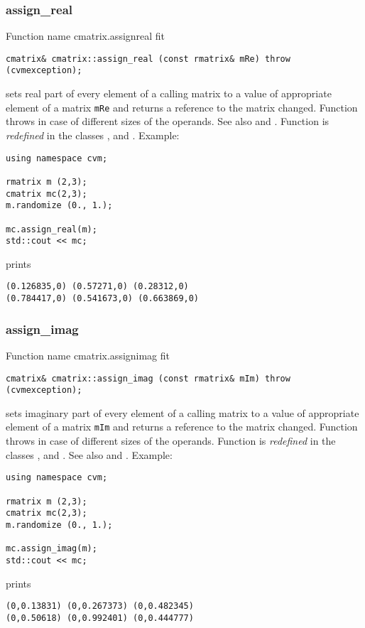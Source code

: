 \subsubsection{assign\_real}
Function%
\pdfdest name {cmatrix.assignreal} fit
\begin{verbatim}
cmatrix& cmatrix::assign_real (const rmatrix& mRe) throw (cvmexception);
\end{verbatim}
sets real part of every element of a calling matrix to a value of
appropriate element of a matrix \verb"mRe"
and returns a reference to
the matrix changed.
Function throws  
in case of different sizes of the operands.
See also  and .
Function is \emph{redefined} in the classes
,  
and .
Example:
\begin{Verbatim}
using namespace cvm;

rmatrix m (2,3);
cmatrix mc(2,3);
m.randomize (0., 1.);

mc.assign_real(m);
std::cout << mc;
\end{Verbatim}
prints
\begin{Verbatim}
(0.126835,0) (0.57271,0) (0.28312,0)
(0.784417,0) (0.541673,0) (0.663869,0)
\end{Verbatim}
\newpage




\subsubsection{assign\_imag}
Function%
\pdfdest name {cmatrix.assignimag} fit
\begin{verbatim}
cmatrix& cmatrix::assign_imag (const rmatrix& mIm) throw (cvmexception);
\end{verbatim}
sets imaginary part of every element of a calling matrix to a value of
appropriate element of a matrix \verb"mIm"
and returns a reference to
the matrix changed.
Function throws  
in case of different sizes of the operands.
Function is \emph{redefined} in the classes
,  
and .
See also  and .
Example:
\begin{Verbatim}
using namespace cvm;

rmatrix m (2,3);
cmatrix mc(2,3);
m.randomize (0., 1.);

mc.assign_imag(m);
std::cout << mc;
\end{Verbatim}
prints
\begin{Verbatim}
(0,0.13831) (0,0.267373) (0,0.482345)
(0,0.50618) (0,0.992401) (0,0.444777)
\end{Verbatim}
\newpage




